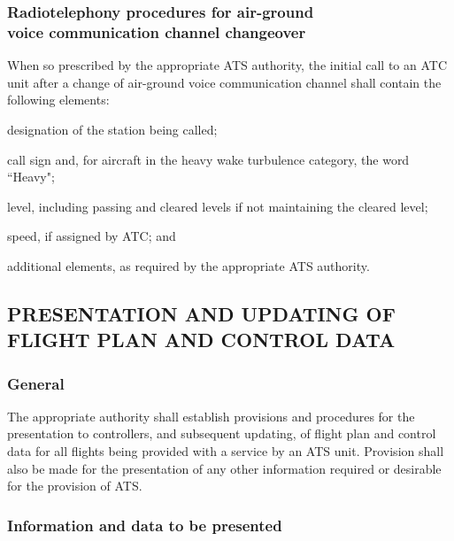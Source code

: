 \subsubsection[Radiotelephony procedures for air-ground voice communication channel changeover]{Radiotelephony procedures for air-ground \\ voice communication channel changeover} \label{4.11.3}

When so prescribed by the appropriate ATS authority, the initial call to an ATC unit after a change of air-ground voice communication channel shall contain the following elements:

\begin{enumalph}
    \item designation of the station being called;
    \item call sign and, for aircraft in the heavy wake turbulence category, the word ``Heavy";
    \item level, including passing and cleared levels if not maintaining the cleared level;
    \item speed, if assigned by ATC; and
    \item additional elements, as required by the appropriate ATS authority.
\end{enumalph}



\subsection[Presentation and updating of flight plan and control data]{PRESENTATION AND UPDATING OF \\ FLIGHT PLAN AND CONTROL DATA}

\subsubsection{General}

The appropriate authority shall establish provisions and procedures for the presentation to controllers, and subsequent updating, of flight plan and control data for all flights being provided with a service by an ATS unit. Provision shall also be made for the presentation of any other information required or desirable for the provision of ATS.

\subsubsection{Information and data to be presented}

